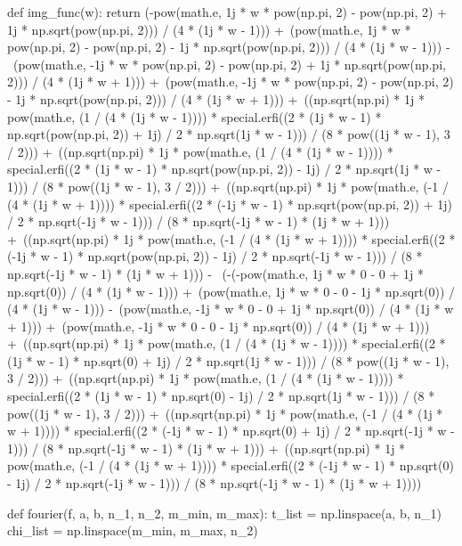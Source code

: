 \documentclass[a4paper, 14pt, titlepage, fleqn]{extarticle}
\begin{document}
\begin{specialx}
\begin{python}
def img_func(w):
    return (-pow(math.e, 1j * w * pow(np.pi, 2) - pow(np.pi, 2) + 1j * np.sqrt(pow(np.pi, 2))) / (4 * (1j * w - 1))) +\
        (pow(math.e, 1j * w * pow(np.pi, 2) - pow(np.pi, 2) - 1j * np.sqrt(pow(np.pi, 2))) / (4 * (1j * w - 1))) -\
        (pow(math.e, -1j * w * pow(np.pi, 2) - pow(np.pi, 2) + 1j * np.sqrt(pow(np.pi, 2))) / (4 * (1j * w + 1))) +\
        (pow(math.e, -1j * w * pow(np.pi, 2) - pow(np.pi, 2) - 1j * np.sqrt(pow(np.pi, 2))) / (4 * (1j * w + 1))) +\
        ((np.sqrt(np.pi) * 1j * pow(math.e, (1 / (4 * (1j * w - 1)))) * special.erfi((2 * (1j * w - 1) *
        np.sqrt(pow(np.pi, 2)) + 1j) / 2 * np.sqrt(1j * w - 1))) / (8 * pow((1j * w - 1), 3 / 2))) +\
        ((np.sqrt(np.pi) * 1j * pow(math.e, (1 / (4 * (1j * w - 1)))) * special.erfi((2 * (1j * w - 1) *
        np.sqrt(pow(np.pi, 2)) - 1j) / 2 * np.sqrt(1j * w - 1))) / (8 * pow((1j * w - 1), 3 / 2))) +\
        ((np.sqrt(np.pi) * 1j * pow(math.e, (-1 / (4 * (1j * w + 1)))) * special.erfi((2 * (-1j * w - 1) *
        np.sqrt(pow(np.pi, 2)) + 1j) / 2 * np.sqrt(-1j * w - 1))) / (8 * np.sqrt(-1j * w - 1) * (1j * w + 1))) +\
        ((np.sqrt(np.pi) * 1j * pow(math.e, (-1 / (4 * (1j * w + 1)))) * special.erfi((2 * (-1j * w - 1) *
        np.sqrt(pow(np.pi, 2)) - 1j) / 2 * np.sqrt(-1j * w - 1))) / (8 * np.sqrt(-1j * w - 1) * (1j * w + 1))) - \
        (-(-pow(math.e, 1j * w * 0 - 0 + 1j * np.sqrt(0)) / (4 * (1j * w - 1))) +\
        (pow(math.e, 1j * w * 0 - 0 - 1j * np.sqrt(0)) / (4 * (1j * w - 1))) -\
        (pow(math.e, -1j * w * 0 - 0 + 1j * np.sqrt(0)) / (4 * (1j * w + 1))) +\
        (pow(math.e, -1j * w * 0 - 0 - 1j * np.sqrt(0)) / (4 * (1j * w + 1))) +\
        ((np.sqrt(np.pi) * 1j * pow(math.e, (1 / (4 * (1j * w - 1)))) * special.erfi((2 * (1j * w - 1) *
        np.sqrt(0) + 1j) / 2 * np.sqrt(1j * w - 1))) / (8 * pow((1j * w - 1), 3 / 2))) +\
        ((np.sqrt(np.pi) * 1j * pow(math.e, (1 / (4 * (1j * w - 1)))) * special.erfi((2 * (1j * w - 1) *
        np.sqrt(0) - 1j) / 2 * np.sqrt(1j * w - 1))) / (8 * pow((1j * w - 1), 3 / 2))) +\
        ((np.sqrt(np.pi) * 1j * pow(math.e, (-1 / (4 * (1j * w + 1)))) * special.erfi((2 * (-1j * w - 1) *
        np.sqrt(0) + 1j) / 2 * np.sqrt(-1j * w - 1))) / (8 * np.sqrt(-1j * w - 1) * (1j * w + 1))) +\
        ((np.sqrt(np.pi) * 1j * pow(math.e, (-1 / (4 * (1j * w + 1)))) * special.erfi((2 * (-1j * w - 1) *
        np.sqrt(0) - 1j) / 2 * np.sqrt(-1j * w - 1))) / (8 * np.sqrt(-1j * w - 1) * (1j * w + 1))))


def fourier(f, a, b, n_1, n_2, m_min, m_max):
    t_list = np.linspace(a, b, n_1)
    chi_list = np.linspace(m_min, m_max, n_2)


\end{python}
\end{specialx}
\end{document}
